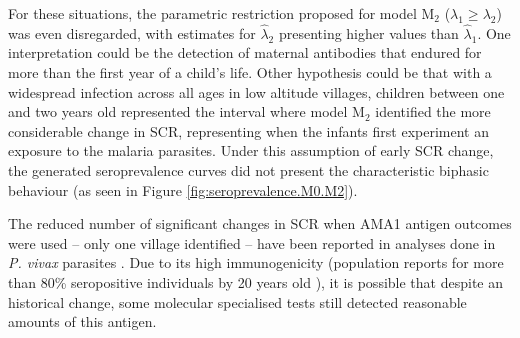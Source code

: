 For these situations, the parametric restriction proposed for model M$_2$ ($\lambda_1\geq\lambda_2$) was even disregarded, with estimates for $ \widehat{\lambda}_2$ presenting higher values than $ \widehat{\lambda}_1$.
One interpretation could be the detection of maternal antibodies that endured for more than the first year of a child's life.
Other hypothesis could be that with a widespread infection across all ages in low altitude villages, children between one and two years old represented the interval where model M$_2$ identified the more considerable change in SCR, representing when the infants first experiment an exposure to the malaria parasites.
Under this assumption of early SCR change, the generated seroprevalence curves did not present the characteristic biphasic behaviour (as seen in Figure \ref{fig:seroprevalence.M0.M2}).

The reduced number of significant changes in SCR when AMA1 antigen outcomes were used -- only one village identified -- have been reported in analyses done in \textit{P. vivax} parasites \cite{cook2010using}.
Due to its high immunogenicity (population reports for more than 80\% seropositive individuals by 20 years old \cite{ondigo2014estimation}), it is possible that despite an historical change, some molecular specialised tests still detected reasonable amounts of this antigen.



